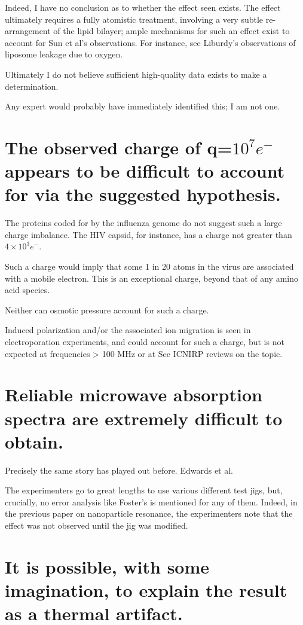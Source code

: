 \documentclass[fleqn,10pt]{paper}
\begin{document}
Indeed, I have no conclusion as to whether the effect seen exists. The effect ultimately requires a 
fully atomistic treatment, involving a very subtle re-arrangement of the lipid bilayer; ample 
mechanisms for such an effect exist to account for Sun et al's observations. For instance, see 
Liburdy's observations of liposome leakage due to oxygen.

Ultimately I do not believe sufficient high-quality data exists to make a determination.

Any expert would probably have immediately identified this; I am not one. 

\section{The observed charge of q=$10^7 e^-$ appears to be difficult to account for via the 
suggested hypothesis.}

The proteins coded for by the influenza genome do not suggest such a large charge imbalance. The 
HIV capsid, for instance, has a charge not greater than $4\times 10^3 e^-$.

Such a charge would imply that some 1 in 20 atoms in the virus are associated with a mobile 
electron. This is an exceptional charge, beyond that of any amino acid species.

Neither can osmotic pressure account for such a charge. 

Induced polarization and/or the associated ion migration is seen in electroporation experiments, 
and could account for such a charge, but is not expected at frequencies > 100 MHz or at  See ICNIRP 
reviews on the topic.

\section{Reliable microwave absorption spectra are extremely difficult to obtain.}

Precisely the same story has played out before. Edwards et al. 

The experimenters go to great lengths to use various different test jigs, but, crucially, no error analysis like Foster's is mentioned for any of them. Indeed, in the previous paper on nanoparticle resonance, the experimenters note that the effect was not observed until the jig was modified.

\section{It is possible, with some imagination, to explain the result as a thermal artifact.}
\end{document}
